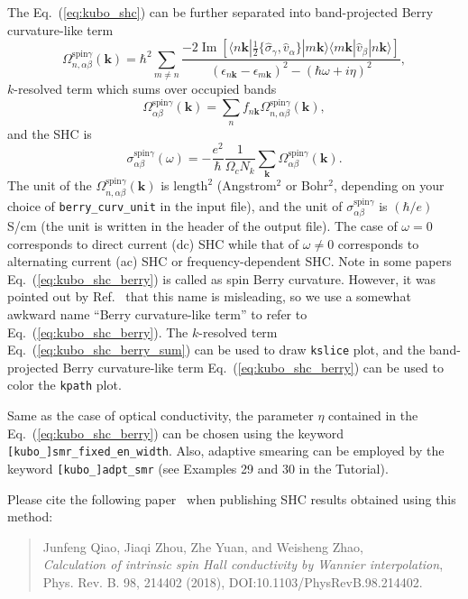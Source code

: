 The Eq.~(\ref{eq:kubo_shc}) can be further separated into 
band-projected Berry curvature-like term
\begin{equation}
\label{eq:kubo_shc_berry}
\Omega_{n,\alpha\beta}^{\text{spin}\gamma}(\bm{k}) = {\hbar}^2 \sum_{
	m\ne n}\frac{-2\operatorname{Im}[\langle n\bm{k}| 
	\frac{1}{2}\{\hat{\sigma}_{\gamma},\hat{v}_{\alpha}\}|m\bm{k}\rangle
	\langle m\bm{k}| \hat{v}_{\beta}|n\bm{k}\rangle]}
{(\epsilon_{n\bm{k}}-\epsilon_{m\bm{k}})^2-(\hbar\omega+i\eta)^2},
\end{equation}
$k$-resolved term which sums over occupied bands
\begin{equation}
\label{eq:kubo_shc_berry_sum}
\Omega_{\alpha\beta}^{\text{spin}\gamma}(\bm{k}) = \sum_{n}
f_{n\bm{k}} \Omega_{n,\alpha\beta}^{\text{spin}\gamma}(\bm{k}),
\end{equation}
and the SHC is 
\begin{equation}
\sigma_{\alpha\beta}^{\text{spin}\gamma}(\omega) = 
-\frac{e^2}{\hbar}\frac{1}{\Omega_c N_k}\sum_{\bm{k}}
\Omega_{\alpha\beta}^{\text{spin}\gamma}(\bm{k}).
\end{equation}
The unit of the $\Omega_{n,\alpha\beta}^{\text{spin}\gamma}(\bm{k})$ 
is $\text{length}^{2}$ (Angstrom$^2$ or Bohr$^2$, depending on your 
choice of {\tt berry\_curv\_unit} in the input file), 
and the unit of  $\sigma_{\alpha\beta}^{\text{spin}\gamma}$ 
is $(\hbar/e)$S/cm (the unit is written in the header of the output file). 
The case of $\omega=0$ corresponds to 
direct current (dc) SHC while that of $\omega\ne0$ 
corresponds to alternating current (ac) SHC or frequency-dependent SHC. 
Note in some papers Eq.~(\ref{eq:kubo_shc_berry}) is called as 
spin Berry curvature. However, it was pointed out by 
Ref.~\cite{Gradhand_2012} that this 
name is misleading, so we use a somewhat awkward name 
``Berry curvature-like term'' to refer to Eq.~(\ref{eq:kubo_shc_berry}). 
The $k$-resolved term Eq.~(\ref{eq:kubo_shc_berry_sum}) can be 
used to draw {\tt kslice} plot, and the band-projected Berry curvature-like term 
Eq.~(\ref{eq:kubo_shc_berry})
can be used to color the {\tt kpath} plot. 

Same as the case of optical conductivity, the parameter
$\eta$ contained in the Eq.~(\ref{eq:kubo_shc_berry}) can be chosen using the keyword {\tt[kubo\_]smr\_fixed\_en\_width}. Also, adaptive smearing can 
be employed by the keyword {\tt [kubo\_]adpt\_smr} 
(see Examples 29 and 30 in the Tutorial). 

Please cite the following paper~\cite{qiao-prb2018} when publishing SHC results obtained using this method:
\begin{quote}
	Junfeng Qiao, Jiaqi Zhou, Zhe Yuan, and Weisheng Zhao, \\
	\emph{Calculation of intrinsic spin Hall conductivity by Wannier interpolation},\\
	Phys. Rev. B. 98, 214402 (2018), DOI:10.1103/PhysRevB.98.214402.
\end{quote}


